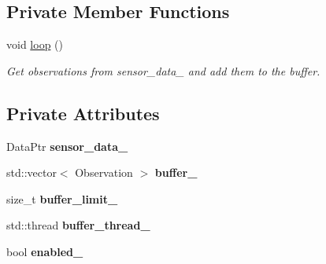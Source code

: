 \subsection*{Private Member Functions}
\begin{DoxyCompactItemize}
\item 
\mbox{\label{classrobot__interfaces_1_1SensorLogger_af05366bd0418ab2dea5a8f7de4031c5b}} 
void \hyperlink{classrobot__interfaces_1_1SensorLogger_af05366bd0418ab2dea5a8f7de4031c5b}{loop} ()
\begin{DoxyCompactList}\small\item\em Get observations from sensor\+\_\+data\+\_\+ and add them to the buffer. \end{DoxyCompactList}\end{DoxyCompactItemize}
\subsection*{Private Attributes}
\begin{DoxyCompactItemize}
\item 
\mbox{\label{classrobot__interfaces_1_1SensorLogger_a1771168bc44050029fac7f5943796ff9}} 
Data\+Ptr {\bfseries sensor\+\_\+data\+\_\+}
\item 
\mbox{\label{classrobot__interfaces_1_1SensorLogger_a0fcc2523aa7c8b05a17429c01ec19975}} 
std\+::vector$<$ Observation $>$ {\bfseries buffer\+\_\+}
\item 
\mbox{\label{classrobot__interfaces_1_1SensorLogger_a4ac7be763d55fa33344246fbe20598b6}} 
size\+\_\+t {\bfseries buffer\+\_\+limit\+\_\+}
\item 
\mbox{\label{classrobot__interfaces_1_1SensorLogger_a22eba71448f0428c1b4daf72243e3bf8}} 
std\+::thread {\bfseries buffer\+\_\+thread\+\_\+}
\item 
\mbox{\label{classrobot__interfaces_1_1SensorLogger_a4af2d1815c0f205ea9c5c064723947f1}} 
bool {\bfseries enabled\+\_\+}
\end{DoxyCompactItemize}


